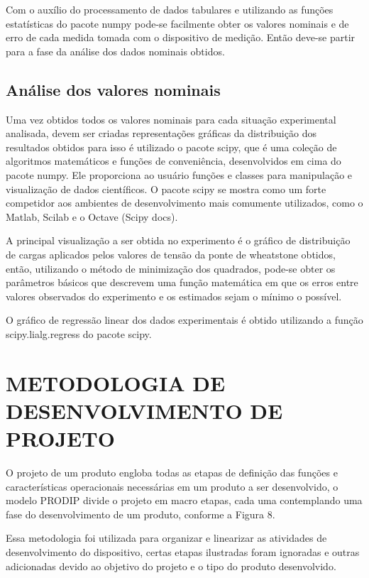 Com o auxílio do processamento de dados tabulares e utilizando as funções estatísticas do pacote numpy pode-se facilmente obter os valores nominais e de erro de cada medida tomada com o dispositivo de medição. Então deve-se partir para a fase da análise dos dados nominais obtidos.

\subsection{Análise dos valores nominais}

Uma vez obtidos todos os valores nominais para cada situação experimental analisada, devem ser criadas representações gráficas da distribuição dos resultados obtidos para isso é utilizado o pacote scipy, que é uma coleção de algoritmos matemáticos e funções de conveniência, desenvolvidos em cima do pacote numpy. Ele proporciona ao usuário funções e classes para manipulação e visualização de dados científicos. O pacote scipy se mostra como um forte competidor aos ambientes de desenvolvimento mais comumente utilizados, como o Matlab, Scilab e o Octave (Scipy docs).

A principal visualização a ser  obtida no experimento é o gráfico de distribuição de cargas aplicados pelos valores de tensão da ponte de wheatstone obtidos, então, utilizando o método de minimização dos quadrados, pode-se obter os parâmetros básicos que descrevem uma função matemática em que os erros entre valores observados do experimento e os estimados sejam o mínimo o possível.

O gráfico de regressão linear dos dados experimentais é obtido utilizando a função scipy.lialg.regress do pacote scipy.

\section{METODOLOGIA DE DESENVOLVIMENTO DE PROJETO}

O projeto de um produto engloba todas as etapas de definição das funções e características operacionais necessárias em um produto a ser desenvolvido, o modelo PRODIP divide o projeto em macro etapas, cada uma contemplando uma fase do desenvolvimento de um produto, conforme a Figura 8.

Essa metodologia foi utilizada para organizar e linearizar as atividades de desenvolvimento do dispositivo, certas etapas ilustradas foram ignoradas e outras adicionadas devido ao objetivo do projeto e o tipo do produto desenvolvido.






